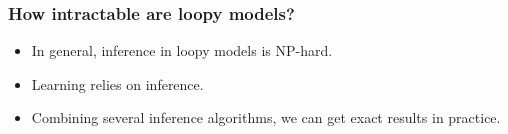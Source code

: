 \documentclass[final,ignorenonframetext,compress]{beamer}
\DeclareMathOperator*{\argmax}{arg\,max}
\begin{document}

    \begin{frame}
        \frametitle{How intractable are loopy models?}
        \begin{itemize}
            \item In general, inference in loopy models is NP-hard.
            \item Learning relies on inference.
            \item Combining several inference algorithms, we can get exact results in practice. %
        \end{itemize}
    \end{frame}


\end{document}
